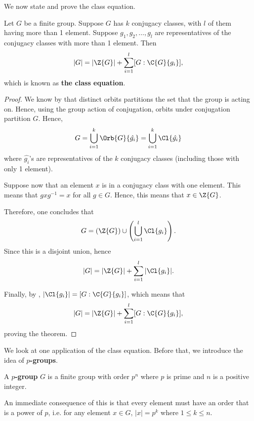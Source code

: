 We now state and prove the class equation.
\begin{theorem}\label{thrm-class-equation}
    Let $G$ be a finite group. Suppose $G$ has $k$ conjugacy classes, with $l$ of them having more than 1 element. Suppose $g_1, g_2, \dots, g_l$ are representatives of the conjugacy classes with more than 1 element. Then
    \[
        |G| = |\Z{G}| + \sum_{i=1}^l [G : \C{G}{g_i}],
    \]
    which is known as \textbf{the class equation}.
\end{theorem}

\begin{proof}
    We know by  that distinct orbits partitions the set that the group is acting on. Hence, using the group action of conjugation, orbits under conjugation partition $G$. Hence,
    \[
        G = \bigcup_{i=1}^k \Orb{G}{\hat{g_i}} = \bigcup_{i=1}^k \Cl{\hat{g_i}}
    \]
    where $\hat{g_i}$'s are representatives of the $k$ conjugacy classes (including those with only 1 element).

    Suppose now that an element $x$ is in a conjugacy class with one element. This means that $gxg^{-1} = x$ for all $g \in G$. Hence, this means that $x \in \Z{G}$.

    Therefore, one concludes that
    \[
        G = \left(\Z{G}\right) \cup \left(\bigcup_{i=1}^l \Cl{g_i}\right).
    \]
    Since this is a disjoint union, hence
    \[
        |G| = |\Z{G}| + \sum_{i=1}^l |\Cl{g_i}|.
    \]

    Finally, by , $|\Cl{g_i}| = [G : \C{G}{g_i}]$, which means that
    \[
        |G| = |\Z{G}| + \sum_{i=1}^l [G:\C{G}{g_i}],
    \]
    proving the theorem.
\end{proof}

We look at one application of the class equation. Before that, we introduce the idea of \textbf{$p$-groups}.
\begin{definition}
    A \textbf{$p$-group} $G$ is a finite group with order $p^n$ where $p$ is prime and $n$ is a positive integer.
\end{definition}
An immediate consequence of this is that every element must have an order that is a power of $p$, i.e. for any element $x \in G$, $|x| = p^k$ where $1 \leq k \leq n$.

